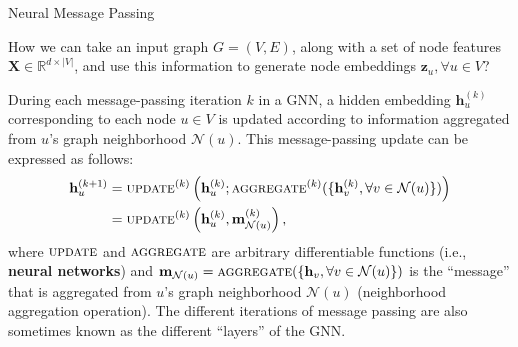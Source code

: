 \documentclass[10pt, aspectratio=169, compress, protectframetitle, handout]{beamer}
\begin{document}
\begin{frame}{Neural Message Passing}

    How we can take an input graph $G = (V, E)$, along with a set of node features $\mathbf X \in \mathbb R^{d \times |V|}$, and use this information to generate node embeddings $\mathbf z_u, \forall u \in V$?
    
    During each message-passing iteration $k$ in a GNN, a \alert{hidden embedding} $\mathbf h^{(k)}_u$ corresponding to each node $u \in V$ is updated according to information aggregated from $u$'s graph neighborhood $\mathcal N(u)$. This message-passing update can be expressed as follows:
    \begin{align}
        \mathbf h^{(k+1)}_u &= \textsc{update}^{(k)} \left( \mathbf h^{(k)}_u; \textsc{aggregate}^{(k)}(\{\mathbf h^{(k)}_v, \forall v \in \mathcal N(u)\}) \right) 
        \label{eq:mess-pass} \\
        &= \textsc{update}^{(k)} \left( \mathbf h^{(k)}_u, \mathbf m^{(k)}_{\mathcal N(u)} \right),
        \label{eq:mess-pass2}
    \end{align}
    where $\textsc{update}$ and $\textsc{aggregate}$ are arbitrary differentiable functions (i.e., \textbf{neural networks}) and $\mathbf m_{\mathcal N(u)} = \textsc{aggregate}(\{\mathbf h_v, \forall v \in \mathcal N(u)\})$ is the ``message'' that is aggregated from $u$'s graph neighborhood $\mathcal N(u)$ (\alert{neighborhood aggregation operation}). The different iterations of message passing are also sometimes known as the different ``layers'' of the GNN.

\end{frame}
\end{document}
